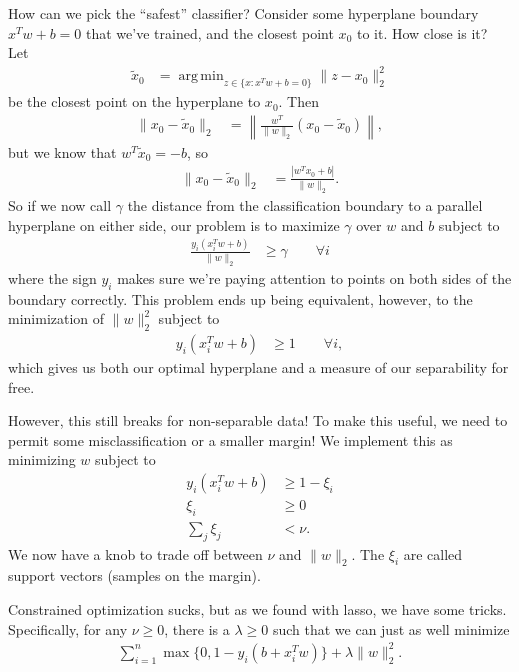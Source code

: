 \documentclass[11pt,letterpaper]{article}
\DeclareMathOperator*{\argmin}{arg\,min}
\theoremstyle{definition}
\theoremstyle{plain}
\numberwithin{equation}{section}
\numberwithin{figure}{section}
\begin{document}
How can we pick the ``safest'' classifier? Consider some hyperplane boundary $x^T w + b = 0$ that we've trained, and the closest point $x_0$ to it. How close is it? Let
%
\begin{align}
	\tilde{x}_0 &= \argmin_{z \in \{x : x^T w + b = 0\}} \|z - x_0 \|_2^2
\end{align}
%
be the closest point on the hyperplane to $x_0$. Then
%
\begin{align}
	\|x_0 - \tilde{x}_0\|_2 &= \left\|\frac{w^T}{\|w\|_2} (x_0-\tilde{x}_0)\right\|,
\end{align}
%
but we know that $w^T \tilde{x}_0 = -b$, so
%
\begin{align}
	\|x_0 - \tilde{x}_0\|_2 &= \frac{|w^T x_0 + b|}{\|w\|_2}.
\end{align}
%
So if we now call $\gamma$ the distance from the classification boundary to a parallel hyperplane on either side, our problem is to maximize $\gamma$ over $w$ and $b$ subject to
%
\begin{align}
	\frac{y_i(x_i^T w + b)}{\|w\|_2} &\geq \gamma \qquad \forall i
\end{align}
%
where the sign $y_i$ makes sure we're paying attention to points on both sides of the boundary correctly. This problem ends up being equivalent, however, to the minimization of $\|w\|_2^2$ subject to
%
\begin{align}
	y_i\left(x_i^T w + b\right) & \geq 1 \qquad \forall i,
\end{align}
%
which gives us both our optimal hyperplane and a measure of our separability for free.




However, this still breaks for non-separable data! To make this useful, we need to permit some misclassification or a smaller margin! We implement this as minimizing $w$ subject to
%
\begin{align}
	y_i(x_i^T w + b) &\geq 1 -\xi_i\\
	\xi_i &\geq 0\\
	\sum_j \xi_j &< \nu.
\end{align}
%
We now have a knob to trade off between $\nu$ and $\|w\|_2$. The $\xi_i$ are called support vectors (samples on the margin).

Constrained optimization sucks, but as we found with lasso, we have some tricks. Specifically, for any $\nu \geq 0$, there is a $\lambda \geq 0$ such that we can just as well minimize
%
\begin{align}
	\sum_{i=1}^n \max\{0, 1 - y_i(b + x_i^T w)\} + \lambda \|w\|_2^2.
\end{align}
\end{document}
